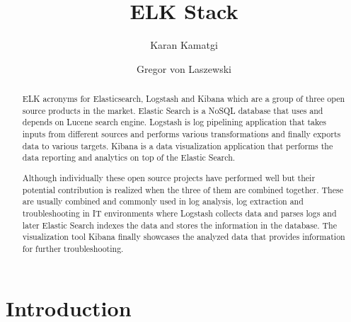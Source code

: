 
\title{ELK Stack}


\author{Karan Kamatgi}


\author{Gregor von Laszewski}


\renewcommand{\shortauthors}{G. v. Laszewski}


\begin{abstract}

ELK acronyms for Elasticsearch, Logstash and Kibana which are a group of three 
open source products in the market. Elastic Search is a NoSQL database that 
uses and depends on Lucene search engine. Logstash is log pipelining application
 that takes inputs from different sources and performs various transformations 
 and finally exports data to various targets. Kibana is a data visualization 
 application that performs the data reporting and analytics on top of the 
 Elastic Search.

Although individually these open source projects have performed well but their 
potential contribution is realized when the three of them are combined together.
 These are usually combined and commonly used in log analysis, log extraction 
 and troubleshooting in IT environments where Logstash collects data and parses 
 logs and later Elastic Search indexes the data and stores the information in 
 the database. The visualization tool Kibana finally showcases the analyzed 
 data that provides information for further troubleshooting.

\end{abstract}



\maketitle


\section{Introduction}

